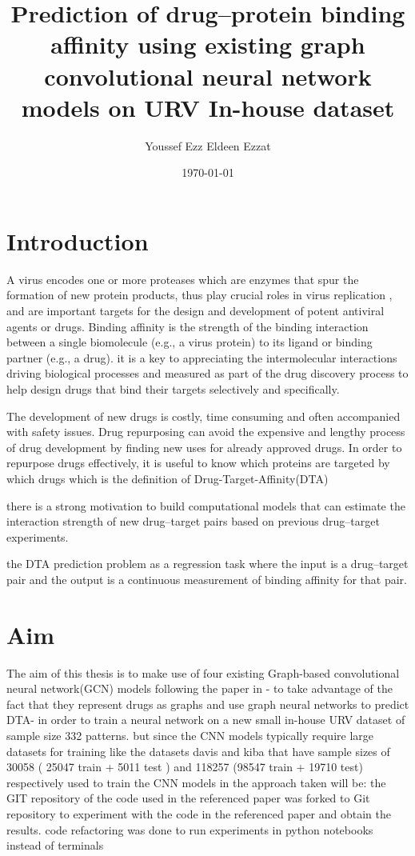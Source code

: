 \documentclass[11pt, a4paper]{article}
\title{Prediction of drug–protein binding affinity using existing graph convolutional neural network models on URV In-house dataset}
\author{Youssef Ezz Eldeen Ezzat}
\date{\today}
\begin{document}


\tableofcontents

\section{Introduction}


A virus encodes one or more proteases which are enzymes that spur the formation of new protein products, thus play crucial roles in virus replication ,
and are important targets for the design and development of potent antiviral agents or drugs.
Binding affinity is the strength of the binding interaction between a single biomolecule (e.g., a virus protein) to its ligand or binding partner (e.g., a drug).
it is a key to appreciating the intermolecular interactions driving biological processes and measured as part of the drug discovery process to help design drugs that bind their targets selectively and specifically.

The development of new drugs is costly, time consuming and often accompanied with safety issues.
Drug repurposing can avoid the expensive and lengthy process of drug development by finding new uses for already approved drugs. In order to repurpose drugs effectively, it is useful to know which proteins are targeted by
which drugs which is the definition of Drug-Target-Affinity(DTA)\cite{1}

there is a strong motivation to build computational models that can estimate the interaction strength of new drug–target pairs based on previous drug–target
experiments.

the DTA prediction problem as a regression task where the input is a drug–target pair and the output is a continuous measurement of binding affinity
for that pair.

\section{Aim}

The aim of this thesis is to make use of four existing Graph-based convolutional neural network(GCN) models following the paper in \cite{1} - to take advantage of the fact that they represent drugs as graphs and use graph neural networks to predict DTA-
in order to train a neural network on a new small in-house URV dataset of sample size 332 patterns. but since the CNN models typically require large datasets for training like the datasets 
davis and kiba that have sample sizes of 30058 ( 25047 train + 5011 test ) and 118257 (98547 train + 19710 test) respectively used to train the CNN models in \cite{1} the approach taken will be:
the GIT repository of the code \cite{2} used in the referenced paper \cite{1} was forked to Git repository \cite{3} to experiment with the 
code in the referenced paper and obtain the results. code refactoring was done to run experiments in python notebooks instead of terminals
\end{document}
